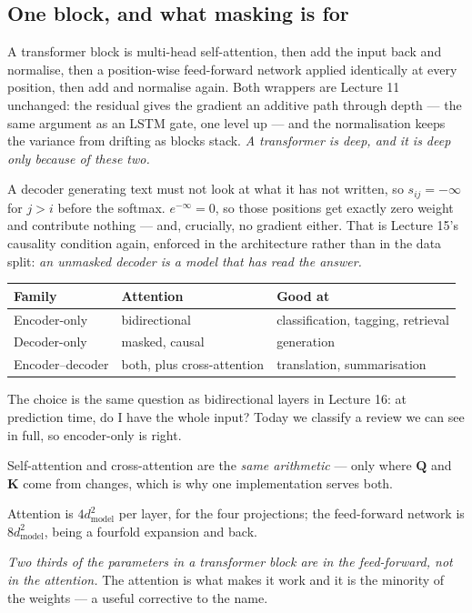 \documentclass[11pt,a4paper]{article}
\begin{document}
\subsection{One block, and what masking is for}

A transformer block is multi-head self-attention, then add the input back and
normalise, then a position-wise feed-forward network applied identically at
every position, then add and normalise again. Both wrappers are Lecture 11
unchanged: the residual gives the gradient an additive path through depth ---
the same argument as an LSTM gate, one level up --- and the normalisation keeps
the variance from drifting as blocks stack. \emph{A transformer is deep, and it
is deep only because of these two.}

A decoder generating text must not look at what it has not written, so
$s_{ij} = -\infty$ for $j > i$ before the softmax. $e^{-\infty} = 0$, so those
positions get exactly zero weight and contribute nothing --- and, crucially, no
gradient either. That is Lecture 15's causality condition again, enforced in
the architecture rather than in the data split: \emph{an unmasked decoder is a
model that has read the answer.}

\begin{center}
\small
\begin{tabular}{lll}
\toprule
\textbf{Family} & \textbf{Attention} & \textbf{Good at} \\
\midrule
Encoder-only & bidirectional & classification, tagging, retrieval \\
Decoder-only & masked, causal & generation \\
Encoder--decoder & both, plus cross-attention & translation, summarisation \\
\bottomrule
\end{tabular}
\end{center}

The choice is the same question as bidirectional layers in Lecture 16: at
prediction time, do I have the whole input? Today we classify a review we can
see in full, so encoder-only is right.

Self-attention and cross-attention are the \emph{same arithmetic} --- only
where $\mathbf{Q}$ and $\mathbf{K}$ come from changes, which is why one
implementation serves both.

\begin{keybox}[title={Where the parameters are}]
Attention is $4d_{\text{model}}^2$ per layer, for the four projections; the
feed-forward network is $8d_{\text{model}}^2$, being a fourfold expansion and
back.

\emph{Two thirds of the parameters in a transformer block are in the
feed-forward, not in the attention.} The attention is what makes it work and it
is the minority of the weights --- a useful corrective to the name.
\end{keybox}
\end{document}

